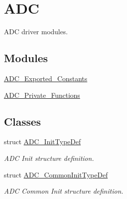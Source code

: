 \hypertarget{group___a_d_c}{}\section{A\+DC}
\label{group___a_d_c}


A\+DC driver modules.  


\subsection*{Modules}
\begin{DoxyCompactItemize}
\item 
\hyperlink{group___a_d_c___exported___constants}{A\+D\+C\+\_\+\+Exported\+\_\+\+Constants}
\item 
\hyperlink{group___a_d_c___private___functions}{A\+D\+C\+\_\+\+Private\+\_\+\+Functions}
\end{DoxyCompactItemize}
\subsection*{Classes}
\begin{DoxyCompactItemize}
\item 
struct \hyperlink{struct_a_d_c___init_type_def}{A\+D\+C\+\_\+\+Init\+Type\+Def}
\begin{DoxyCompactList}\small\item\em A\+DC Init structure definition. \end{DoxyCompactList}\item 
struct \hyperlink{struct_a_d_c___common_init_type_def}{A\+D\+C\+\_\+\+Common\+Init\+Type\+Def}
\begin{DoxyCompactList}\small\item\em A\+DC Common Init structure definition. \end{DoxyCompactList}\end{DoxyCompactItemize}
